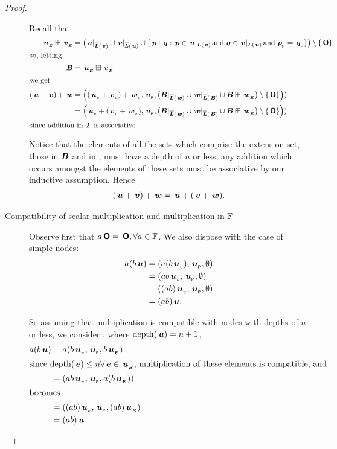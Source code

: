 \begin{proposition}
\begin{proof}
\begin{description}
      Recall that 
      \begin{align*}
          \extn{u}\stplus\extn{v} &= \extnO{u}{v}{p}{q}{+}\\
          \intertext{so, letting}
          \set{B} &= \extn{u}\stplus\extn{v} \\
          \intertext{we get}
          (\node{u}+\node{v})+\node{w} &=\NNNode{(\nv{u} + \nv{v}) + \nv{w}}{\nlabel{u}}{\bigl(\nsrestrictedto{B}{w}\cup\nrestrictedto{w}{B} \cup \set{B}\stplus\extn{w}\bigr)\setminus\{\zerotree\}} \\
          &=\NNNode{\nv{u} + (\nv{v} + \nv{w})}{\nlabel{u}}{\bigl(\nsrestrictedto{B}{w}\cup\nrestrictedto{w}{B}\cup \set{B}\stplus\extn{w}\bigr)\setminus\{\zerotree\}} \\
          \intertext{since addition in $\DOM$ is associative}
      \end{align*}

      Notice that the elements of all the sets which comprise the extension set, those in \(\set{B}\) and in ,
      must have a depth of \(n\) or less; any addition which occurs amongst the elements of these sets must be
      associative by our inductive assumption. Hence
      \begin{align*}
          (\node{u}+\node{v})+\node{w} = \node{u}+(\node{v}+\node{w}).
      \end{align*}


    \item[Compatibility of scalar multiplication and multiplication in $\FIELD$]

      Observe first that \(a \zerotree = \zerotree, \forall a \in
      \FIELD\). We also dispose with the case of simple nodes:
      \begin{align*}
          a(b \node{u}) &= (a(b \nv{u}), \nlabel{u}, \emptyset) \\
          &= (a b \nv{u}, \nlabel{u}, \emptyset) \\
          &= ((a b) \nv{u}, \nlabel{u}, \emptyset) \\
          &= (a b) \node{u};
      \end{align*}

      So assuming that multiplication is compatible with nodes with
      depths of \(n\) or less, we consider , where \(\depth(\node{u})
      = n+1\),
      \begin{align*}
        a (b \node{u}) &= a (b  \nv{u}, \nlabel{u}, b\extn{u}) \\
        \intertext{since \(\depth(\node{e}) \leq n \forall \node{e}\in \extn{u},\) multiplication of these elements is compatible, and }
          &= (a b\/ \nv{u}, \nlabel{u}, a(b\extn{u})) \\
          \intertext{becomes}
          &= ((a b) \nv{u}, \nlabel{u}, (a b)\extn{u}) \\
          &= (a b) \node{u}
      \end{align*}


\end{description}
\end{proof}
\end{proposition}
